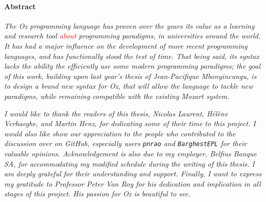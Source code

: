 
\paragraph{Abstract}
\textit{
The \textit{Oz} programming language has proven over the years its value as a learning and research tool \textcolor{red}{about} programming paradigms, in universities around the world.
It has had a major influence on the development of more recent programming languages, and has functionally stood the test of time.
That being said, its syntax lacks the ability the efficiently use some modern programming paradigms;
the goal of this work, building upon last year's thesis of Jean-Pacifique Mbonyincungu, is to design a brand new syntax for \textit{Oz}, that will allow the language to tackle new paradigms, while remaining compatible with the existing Mozart system.
}\newline\newline

\textit{
I would like to thank the readers of this thesis, Nicolas Laurent, Hélène Verhaeghe, and Martin Henz, for dedicating some of their time to this project.\newline
I would also like show our appreciation to the people who contributed to the discussion over on \emph{GitHub}, especially users \texttt{pnrao} and \texttt{BarghestEPL} for their valuable opinions.\newline
Acknowledgement is also due to my employer, \emph{Belfius Banque SA}, for accommodating my modified schedule during the writing of this thesis. I am deeply grateful for their understanding and support.\newline
Finally, I want to express my gratitude to Professor Peter Van Roy for his dedication and implication in all stages of this project. His passion for \emph{Oz} is beautiful to see.
}